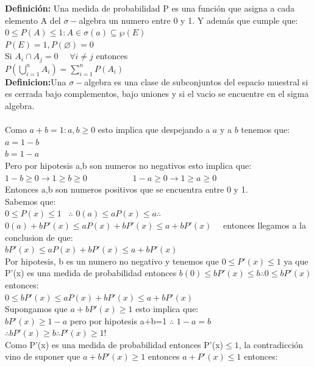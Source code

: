 \documentclass[12pt,a4paper]{report}
\begin{document}
\begin{enumerate}
{    \textbf{Definición:} Una medida de probabilidad P es una función que asigna a cada elemento A del $\sigma-$algebra un numero entre 0 y 1. Y además que cumple que:\\
    $0 \leq P(A) \leq 1 : A \in \sigma(a)\subseteq \wp(E)$\\
    $P(E)=1, P(\varnothing)=0$\\
    Si $A_{i} \cap A_{j} = 0 $ \ \ $\forall i \neq j $ entonces\\
    $P(\bigcup\limits_{i=1}^{n} A_{i})= \sum_{i=1}^{n} P(A_{i})$\\
    \textbf{Definicion:}Una $\sigma-$algebra es una clase de subconjuntos del espacio muestral si es cerrada bajo complementos, bajo uniones y si el  vacio se encuentre en el sigma algebra.\\ \\
    Como $a+b=1 : a,b \geq 0$ esto implica que despejando a $a$ y a $b$ tenemos que:\\
    $a=1-b$\\
    $b=1-a$\\
    Pero por hipotesis a,b son numeros no negativos esto implica que:\\
    $1-b \geq 0 \rightarrow 1 \geq b \geq 0$ \ \ \ \ \ \ \ \ \ \
    $1-a \geq 0 \rightarrow 1\geq a \geq 0$ \\
    Entonces a,b son numeros positivos que se encuentra entre 0 y 1. \\
    Sabemos que:\\
    $0 \leq P(x) \leq 1$ \ $\therefore$ $0(a)\leq aP(x) \leq a \therefore $ \\$ 0(a)+bP'(x)\leq aP(x)+bP'(x) \leq a+bP'(x)$ \ \ entonces llegamos a la conclusion de que:\\
    $bP'(x)\leq aP(x)+bP'(x) \leq a+bP'(x)$\\
    Por hipotesis, b es un numero no negativo y tenemos que $0\leq P'(x)\leq 1$ ya que P'(x) es una medida de probabilidad entonces $b(0)\leq bP'(x) \leq b \therefore 0\leq bP'(x)$ entonces:\\
    $0\leq bP'(x)\leq aP(x)+bP'(x)\leq a+bP'(x)$\\
    Supongamos que $a+bP'(x)\geq 1$ esto implica que:\\
    $bP'(x)\geq 1-a$ pero por hipotesis a+b=1 $\therefore$ $1-a=b$ $\therefore bP'(x)\geq b \therefore P'(x)\geq 1 \textbf{!}$\\
    Como P'(x) es una medida de probabilidad entonces P'(x)$\leq 1$, la contradicción vino de suponer que $a+bP'(x)\geq 1$ entonces $a+P'(x)\leq 1$ entonces:\\
}
\end{enumerate}
\end{document}
